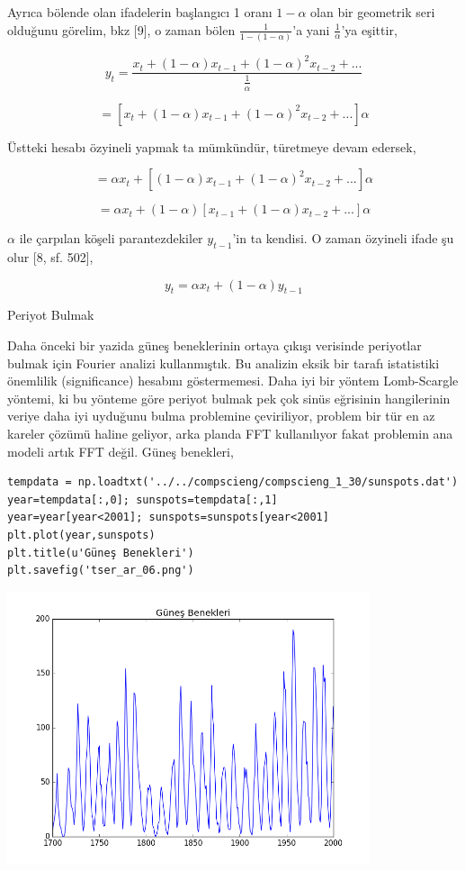 \documentclass[12pt,fleqn]{article}\usepackage{../../common}
\begin{document}
Ayrıca bölende olan ifadelerin başlangıcı 1 oranı $1-\alpha$ olan bir
geometrik seri olduğunu görelim, bkz [9], o zaman bölen
$\frac{1}{1-(1-\alpha)}$'a yani $\frac{1}{\alpha}$'ya eşittir,

$$ y_t = \frac{x_t + (1-\alpha)x_{t-1} + (1-\alpha)^2x_{t-2} + ... }
{\frac{1}{\alpha}}
$$

$$  = [ x_t + (1-\alpha)x_{t-1} + (1-\alpha)^2x_{t-2} + ... ] \alpha $$

Üstteki hesabı özyineli yapmak ta mümkündür, türetmeye devam edersek,

$$  = \alpha x_t + [(1-\alpha)x_{t-1} + (1-\alpha)^2x_{t-2} + ... ]\alpha $$

$$  = \alpha x_t + (1-\alpha) [x_{t-1} + (1-\alpha)x_{t-2} + ... ]\alpha $$

$\alpha$ ile çarpılan köşeli parantezdekiler $y_{t-1}$'in ta kendisi. O
zaman özyineli ifade şu olur [8, sf. 502],

$$ y_t = \alpha x_t + (1-\alpha) y_{t-1}$$

Periyot Bulmak

Daha önceki bir yazida güneş beneklerinin ortaya çıkışı verisinde
periyotlar bulmak için Fourier analizi kullanmıştık. Bu analizin eksik bir
tarafı istatistiki önemlilik (significance) hesabını göstermemesi. Daha iyi
bir yöntem Lomb-Scargle yöntemi, ki bu yönteme göre periyot bulmak pek çok
sinüs eğrisinin hangilerinin veriye daha iyi uyduğunu bulma problemine
çeviriliyor, problem bir tür en az kareler çözümü haline geliyor, arka
planda FFT kullanılıyor fakat problemin ana modeli artık FFT değil. Güneş
benekleri,

\begin{verbatim}
tempdata = np.loadtxt('../../compscieng/compscieng_1_30/sunspots.dat')
year=tempdata[:,0]; sunspots=tempdata[:,1]
year=year[year<2001]; sunspots=sunspots[year<2001]
plt.plot(year,sunspots)
plt.title(u'Güneş Benekleri')
plt.savefig('tser_ar_06.png')
\end{verbatim}

\includegraphics[height=8cm]{tser_ar_06.png}
\end{document}
